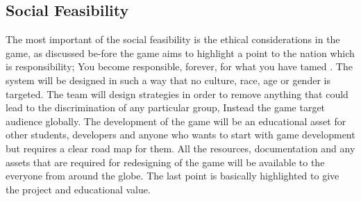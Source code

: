 \subsection{Social Feasibility}

The most important of the social feasibility is the ethical considerations in the game, as discussed be-fore the game aims to highlight a point to the nation which is responsibility; You become responsible, forever, for what you have tamed \cite{saint_exupery_little_1943}.
The system will be designed in such a way that no culture, race, age or gender is targeted. The team will design strategies in order to remove anything that could lead to the discrimination of any particular group, Instead the game target audience globally.
The development of the game will be an educational asset for other students, developers and anyone who wants to start with game development but requires a clear road map for them. All the resources, documentation and any assets that are required for redesigning of the game will be available to the everyone from around the globe.
The last point is basically highlighted to give the project and educational value.

